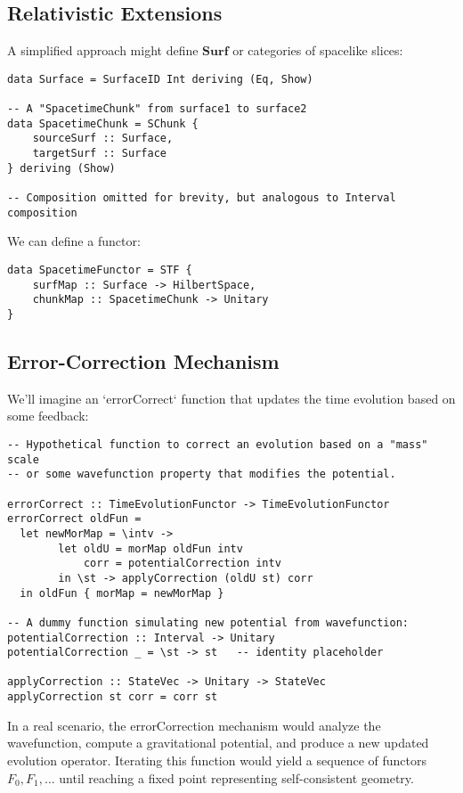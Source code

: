 \documentclass[12pt]{article}
\begin{document}
\subsection{Relativistic Extensions}
A simplified approach might define \(\mathbf{Surf}\) or categories of spacelike slices:

\begin{lstlisting}[caption={Category of Surfaces (toy version)}]
data Surface = SurfaceID Int deriving (Eq, Show)

-- A "SpacetimeChunk" from surface1 to surface2
data SpacetimeChunk = SChunk {
    sourceSurf :: Surface,
    targetSurf :: Surface
} deriving (Show)

-- Composition omitted for brevity, but analogous to Interval composition
\end{lstlisting}

We can define a functor:
\begin{lstlisting}
data SpacetimeFunctor = STF {
    surfMap :: Surface -> HilbertSpace,
    chunkMap :: SpacetimeChunk -> Unitary
}
\end{lstlisting}

\subsection{Error-Correction Mechanism}
We'll imagine an `errorCorrect` function that updates the time evolution based on some feedback:

\begin{lstlisting}[caption={Error-correction iteration},label={lst:errorCorrection}]
-- Hypothetical function to correct an evolution based on a "mass" scale
-- or some wavefunction property that modifies the potential.

errorCorrect :: TimeEvolutionFunctor -> TimeEvolutionFunctor
errorCorrect oldFun = 
  let newMorMap = \intv -> 
        let oldU = morMap oldFun intv
            corr = potentialCorrection intv
        in \st -> applyCorrection (oldU st) corr
  in oldFun { morMap = newMorMap }

-- A dummy function simulating new potential from wavefunction:
potentialCorrection :: Interval -> Unitary
potentialCorrection _ = \st -> st   -- identity placeholder

applyCorrection :: StateVec -> Unitary -> StateVec
applyCorrection st corr = corr st
\end{lstlisting}

In a real scenario, the errorCorrection mechanism would analyze the wavefunction, compute a gravitational potential, and produce a new updated evolution operator. Iterating this function would yield a sequence of functors \(F_0, F_1, \ldots\) until reaching a fixed point representing self-consistent geometry.
\end{document}
